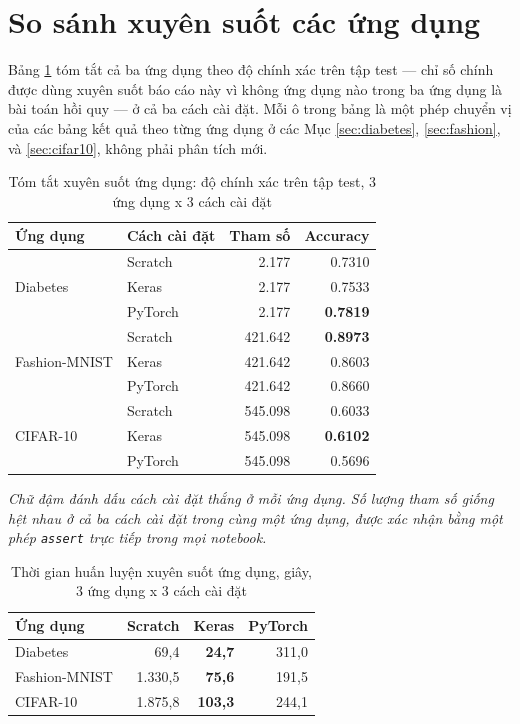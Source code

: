 \documentclass[11pt]{article}
\newcommand{\code}[1]{\texttt{#1}}
\begin{document}
\newpage
\section{So sánh xuyên suốt các ứng dụng}
\label{sec:cross}

Bảng \ref{tab:cross-app} tóm tắt cả ba ứng dụng theo độ chính xác trên tập
test — chỉ số chính được dùng xuyên suốt báo cáo này vì không ứng dụng nào
trong ba ứng dụng là bài toán hồi quy — ở cả ba cách cài đặt. Mỗi ô trong
bảng là một phép chuyển vị của các bảng kết quả theo từng ứng dụng ở các
Mục \ref{sec:diabetes}, \ref{sec:fashion}, và \ref{sec:cifar10}, không
phải phân tích mới.

\begin{table}[H]
\centering
\caption{Tóm tắt xuyên suốt ứng dụng: độ chính xác trên tập test, 3 ứng
dụng x 3 cách cài đặt}
\label{tab:cross-app}
\begin{tabular}{llrr}
\toprule
Ứng dụng & Cách cài đặt & Tham số & Accuracy \\
\midrule
\multirow{3}{*}{Diabetes}
  & Scratch & 2.177 & 0.7310 \\
  & Keras & 2.177 & 0.7533 \\
  & PyTorch & 2.177 & \textbf{0.7819} \\
\midrule
\multirow{3}{*}{Fashion-MNIST}
  & Scratch & 421.642 & \textbf{0.8973} \\
  & Keras & 421.642 & 0.8603 \\
  & PyTorch & 421.642 & 0.8660 \\
\midrule
\multirow{3}{*}{CIFAR-10}
  & Scratch & 545.098 & 0.6033 \\
  & Keras & 545.098 & \textbf{0.6102} \\
  & PyTorch & 545.098 & 0.5696 \\
\bottomrule
\end{tabular}
\end{table}

\noindent\textit{Chữ đậm đánh dấu cách cài đặt thắng ở mỗi ứng dụng. Số
lượng tham số giống hệt nhau ở cả ba cách cài đặt trong cùng một ứng dụng,
được xác nhận bằng một phép \code{assert} trực tiếp trong mọi notebook.}

\begin{table}[H]
\centering
\caption{Thời gian huấn luyện xuyên suốt ứng dụng, giây, 3 ứng dụng x 3
cách cài đặt}
\label{tab:cross-time}
\begin{tabular}{lrrr}
\toprule
Ứng dụng & Scratch & Keras & PyTorch \\
\midrule
Diabetes & 69,4 & \textbf{24,7} & 311,0 \\
Fashion-MNIST & 1.330,5 & \textbf{75,6} & 191,5 \\
CIFAR-10 & 1.875,8 & \textbf{103,3} & 244,1 \\
\bottomrule
\end{tabular}
\end{table}
\end{document}
